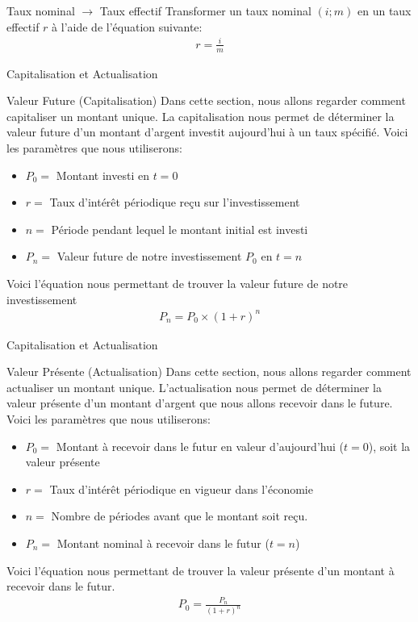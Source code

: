 \documentclass{beamer}
\begin{document}
\begin{frame}{Taux nominal $\rightarrow$ Taux effectif}
Transformer un taux nominal $(i;m)$ en un taux effectif $r$ à l'aide de l'équation suivante:
\begin{align*}
r=\frac{i}{m}
\end{align*}
\end{frame}

\begin{frame}{Capitalisation et Actualisation}
\begin{block}{Valeur Future (Capitalisation)}
Dans cette section, nous allons regarder comment capitaliser un montant unique. La capitalisation nous permet de déterminer la valeur future d'un montant d'argent investit aujourd'hui à un taux spécifié. Voici les paramètres que nous utiliserons:
\begin{itemize}
\item $P_0=$ Montant investi en $t=0$ 
\item $r=$ Taux d'intérêt périodique reçu sur l'investissement
\item $n=$ Période pendant lequel le montant initial est investi
\item $P_n=$ Valeur future de notre investissement $P_0$ en $t=n$
\end{itemize}
Voici l'équation nous permettant de trouver la valeur future de notre investissement 
\begin{align*}
P_n=P_0 \times (1+r)^n
\end{align*}
\end{block}
\end{frame}

\begin{frame}{Capitalisation et Actualisation}
\begin{block}{Valeur Présente (Actualisation)}
Dans cette section, nous allons regarder comment actualiser un montant unique. L'actualisation nous permet de déterminer la valeur présente d'un montant d'argent que nous allons recevoir dans le future. Voici les paramètres que nous utiliserons:
\begin{itemize}
\item $P_0=$ Montant à recevoir dans le futur en valeur d'aujourd'hui ($t=0$), soit la valeur présente  
\item $r=$ Taux d'intérêt périodique en vigueur dans l'économie
\item $n=$ Nombre de périodes avant que le montant soit reçu.
\item $P_n=$ Montant nominal à recevoir dans le futur ($t=n$)
\end{itemize}
Voici l'équation nous permettant de trouver la valeur présente d'un montant à recevoir dans le futur.
\begin{align*}
P_0=\frac{P_n}{(1+r)^n}
\end{align*}
\end{block}
\end{frame}
\end{document}
